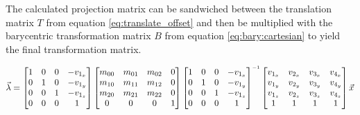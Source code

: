 The  calculated  projection matrix can be  sandwiched  between  the  translation
matrix  $T$  from equation \ref{eq:translate_offset} and then be multiplied with
the  barycentric transformation matrix $B$ from equation \ref{eq:bary:cartesian}
to yield the final transformation matrix.

\begin{align*}
    \vec{\lambda} = 
    \begin{bmatrix}
        1 & 0 & 0 & -v_{1_x} \\
        0 & 1 & 0 & -v_{1_y} \\
        0 & 0 & 1 & -v_{1_z} \\
        0 & 0 & 0 & 1 \\
    \end{bmatrix}
    \begin{bmatrix}
        m_{00} & m_{01} & m_{02} & 0 \\
        m_{10} & m_{11} & m_{12} & 0 \\
        m_{20} & m_{21} & m_{22} & 0 \\
        0      & 0      & 0      & 1 \\
    \end{bmatrix}
    \begin{bmatrix}
        1 & 0 & 0 & -v_{1_x} \\
        0 & 1 & 0 & -v_{1_y} \\
        0 & 0 & 1 & -v_{1_z} \\
        0 & 0 & 0 & 1 \\
    \end{bmatrix}\inverse
    \begin{bmatrix}
        v_{1_x} & v_{2_x} & v_{3_x} & v_{4_x} \\
        v_{1_y} & v_{2_y} & v_{3_y} & v_{4_y} \\
        v_{1_z} & v_{2_z} & v_{3_z} & v_{4_z} \\
        1 & 1 & 1 & 1 \\
    \end{bmatrix}
    \vec{x}
\end{align*}

